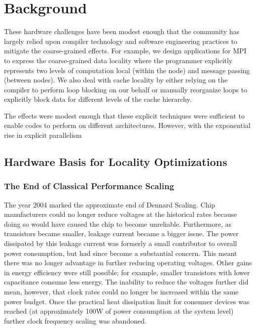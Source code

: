 \chapter{Background}
\label{ch:background}

These hardware challenges have been modest enough that the community has largely relied upon compiler technology and software engineering practices to mitigate the coarse-grained effects.  For example, we design applications for MPI to express the coarse-grained data locality where the programmer explicitly represents two levels of computation local (within the node) and message passing (between nodes).  We also deal with cache locality by either relying on the compiler to perform loop blocking on our behalf or manually reorganize loops to explicitly block data for different levels of the cache hierarchy.

The effects were modest enough that these explicit techniques were sufficient to enable codes to perform on different architectures.  However, with the exponential rise in explicit parallelism

\section{Hardware Basis for Locality Optimizations}

\subsection{The End of Classical Performance Scaling}

The year 2004 marked the approximate end of Dennard Scaling. Chip manufacturers could no longer reduce voltages at the historical rates because doing so would have caused the chip to become unreliable. Furthermore, as transistors became smaller, leakage current became a bigger issue. The power dissipated by this leakage current was formerly a small contributor to overall power consumption, but had since become a substantial concern. This meant there was no longer advantage in further reducing operating voltages. Other gains in energy efficiency were still possible; for example, smaller transistors with lower capacitance consume less energy. The inability to reduce the voltages further did mean, however, that clock rates could no longer be increased within the same power budget. Once the practical heat dissipation limit for consumer devices was reached (at approximately 100W of power consumption at the system level) further clock frequency scaling was abandoned.  %


